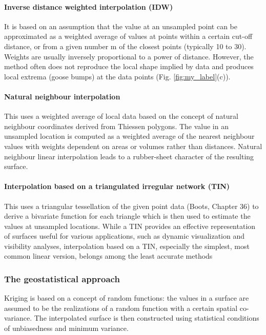 \documentclass{article}
\begin{document}
\paragraph{Inverse distance weighted interpolation (IDW)}
It is based on an assumption that the value at an unsampled point can be approximated as a weighted average of values at points within a certain cut-off distance, or from a given number m of the closest points (typically 10 to 30). Weights are usually inversely proportional to a power of distance. However, the method often does not reproduce the local shape implied by data and produces local extrema (goose bumps) at the data points (Fig. \ref{fig:my_label}(c)).

\paragraph{Natural neighbour interpolation}
This uses a weighted average of local data based on the concept of natural neighbour coordinates derived from Thiessen polygons. The value in an unsampled location is computed as a weighted average of the nearest neighbour values with weights dependent on areas or volumes rather than distances. Natural neighbour linear interpolation leads to a rubber-sheet character of the resulting surface.

\paragraph{Interpolation based on a triangulated irregular network (TIN)}
This uses a triangular tessellation of the given point data (Boots, Chapter 36) to derive a bivariate function for each triangle which is then used to estimate the values at unsampled locations. While a TIN provides an effective representation of surfaces useful for various applications, such as dynamic visualization and visibility analyses, interpolation based on a TIN, especially the simplest, most common linear version, belongs among the least accurate methods 

\subsubsection{The geostatistical approach}
Kriging is based on a concept of random functions: the values in a surface are assumed to be the realizations of a random function with a certain spatial co-variance. The interpolated surface is then constructed using statistical conditions of unbiasedness and minimum variance. 
\end{document}
